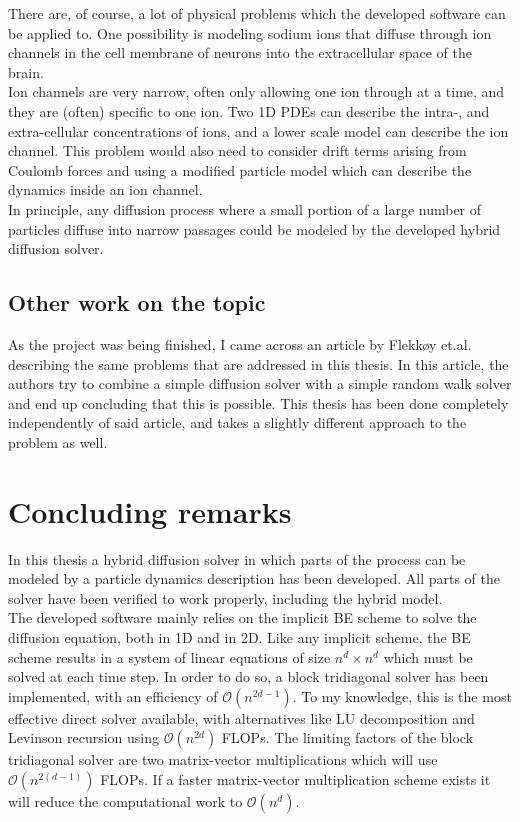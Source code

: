 There are, of course, a lot of physical problems which the developed software can be applied to. 
One possibility is modeling sodium ions that diffuse through ion channels in the cell membrane of neurons into the extracellular space of the brain. \\
Ion channels are very narrow, often only allowing one ion through at a time, and they are (often) specific to one ion. 
Two 1D PDEs can describe the intra-, and extra-cellular concentrations of ions, and a lower scale model can describe the ion channel. 
This problem would also need to consider drift terms arising from Coulomb forces and using a modified particle model which can describe the dynamics inside an ion channel. \\

In principle, any diffusion process where a small portion of a large number of particles diffuse into narrow passages could be modeled by the developed hybrid diffusion solver.

\subsection{Other work on the topic}

As the project was being finished, I came across an article by Flekkøy et.al.\cite{flekkoy2001coupling} describing the same problems that are addressed in this thesis. 
In this article, the authors try to combine a simple diffusion solver with a simple random walk solver and end up concluding that this is possible. 
This thesis has been done completely independently of said article, and takes a slightly different approach to the problem as well. \\



\section{Concluding remarks}

In this thesis a hybrid diffusion solver in which parts of the process can be modeled by a particle dynamics description has been developed. 
All parts of the solver have been verified to work properly, including the hybrid model. \\


The developed software mainly relies on the implicit BE scheme to solve the diffusion equation, both in 1D and in 2D. 
Like any implicit scheme, the BE scheme results in a system of linear equations of size $n^d\times n^d$ which must be solved at each time step. 
In order to do so, a block tridiagonal solver has been implemented, with an efficiency of $\mathcal{O}(n^{2d-1})$. 
To my knowledge, this is the most effective direct solver available, with alternatives like LU decomposition and Levinson recursion using $\mathcal{O}(n^{2d})$ FLOPs. 
The limiting factors of the block tridiagonal solver are two matrix-vector multiplications which will use $\mathcal{O}(n^{2(d-1)})$ FLOPs. 
If a faster matrix-vector multiplication scheme exists it will reduce the computational work to $\mathcal{O}(n^d)$. \\

